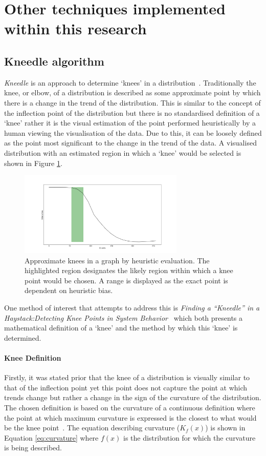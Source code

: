 \section{Other techniques implemented within this research}

\subsection{Kneedle algorithm} \label{sec:kneedle}
\textit{Kneedle} is an approach to determine `knees' in a distribution~\cite{kneedle_paper}. Traditionally the knee, or elbow, of a distribution is described as some approximate point by which there is a change in the trend of the distribution. This is similar to the concept of the inflection point of the distribution but there is no standardised definition of a `knee' rather it is the visual estimation of the point performed heuristically by a human viewing the visualisation of the data. Due to this, it can be loosely defined as the point most significant to the change in the trend of the data. A visualised distribution with an estimated region in which a `knee' would be selected is shown in Figure \ref{fig:knees}.\par
\begin{figure}
    \centering
    \includegraphics[width=0.7\textwidth]{figs/ch2figs/knees.png}
    \caption[Approximate knees in a graph by heuristic evaluation]{Approximate knees in a graph by heuristic evaluation. The highlighted region designates the likely region within which a knee point would be chosen. A range is displayed as the exact point is dependent on heuristic bias.}
    \label{fig:knees}
\end{figure}
One method of interest that attempts to address this is \textit{Finding a ``Kneedle'' in a Haystack:Detecting Knee Points in System Behavior}~\cite{kneedle_paper} which both presents a mathematical definition of a `knee' and the method by which this `knee' is determined. \paragraph{Knee Definition} Firstly, it was stated prior that the knee of a distribution is visually similar to that of the inflection point yet this point does not capture the point at which trends change but rather a change in the sign of the curvature of the distribution. The chosen definition is based on the curvature of a continuous definition where the point at which maximum curvature is expressed is the closest to what would be the knee point~\cite[p.2]{kneedle_paper}. The equation describing curvature ($K_f(x)$) is shown in Equation \ref{eq:curvature} where $f(x)$ is the distribution for which the curvature is being described.\par
